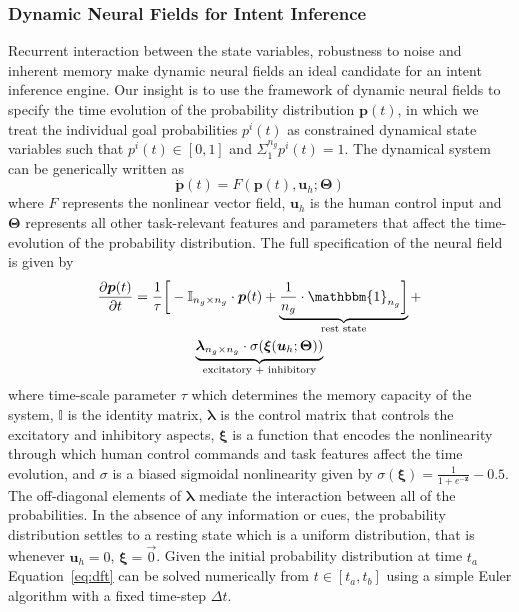 \subsubsection{Dynamic Neural Fields for Intent Inference}\label{sssec:dft_ii}

Recurrent interaction between the state variables, 
robustness to noise and inherent memory make dynamic neural fields an ideal candidate for an intent inference engine. Our insight is to use the framework of dynamic neural fields to specify the time evolution of the probability distribution $\boldsymbol{p}(t)$, in which we treat the individual goal probabilities $p^i(t)$ as constrained dynamical state variables such that $p^i(t) \in [0, 1]$ and $\Sigma_{1}^{n_g}p^{i}(t) = 1$. The dynamical system can be generically written as 
\begin{equation}
\dot{\boldsymbol{p}}(t) = F(\boldsymbol{p}(t), \boldsymbol{u}_h ; \boldsymbol{\Theta})
\end{equation}
where $F$ represents the nonlinear vector field, $\boldsymbol{u}_h$ is the human control input and $\boldsymbol{\Theta}$ represents all other task-relevant features and parameters that affect the time-evolution of the probability distribution. 
The full specification of the neural field is given by
\begin{multline}\label{eq:dft}
\frac{\partial \boldsymbol{p}(t)}{\partial t} = \frac{1}{\tau}\bigg[-\mathbb{I}_{n_g\times n_g}\cdot\boldsymbol{p}(t) + \underbrace{\frac{1}{n_g}\cdot\mathbbm{1}_{n_g}\bigg]}_{\text{rest state}} + \\ \underbrace{\boldsymbol{\lambda}_{n_g\times n_g}\cdot\sigma(\boldsymbol{\xi}(\boldsymbol{u}_h;\boldsymbol{\Theta}))}_{\text{excitatory + inhibitory}}
\end{multline}
where time-scale parameter $\tau$ which determines the memory capacity of the system, $\mathbb{I}$ is the identity matrix, $\boldsymbol{\lambda}$ is the control matrix that controls the excitatory and inhibitory aspects, $\boldsymbol{\xi}$ is a function that encodes the nonlinearity through which human control commands and task features affect the time evolution, and $\sigma$ is a biased sigmoidal nonlinearity given by $\sigma(\boldsymbol{\xi}) = \frac{1}{1 + e^{-\boldsymbol{z}}} - 0.5$.
The off-diagonal elements of $\boldsymbol{\lambda}$ mediate the interaction between all of the probabilities. In the absence of any information or cues, the probability distribution settles to a resting state which is a uniform distribution, that is whenever $\boldsymbol{u}_h = 0$, $\boldsymbol{\xi} = \vec{0}$. Given the initial probability distribution at time $t_a$ Equation~\ref{eq:dft} can be solved numerically from $t \in [t_a, t_b]$ using a simple Euler algorithm with a fixed time-step $\Delta t$.


